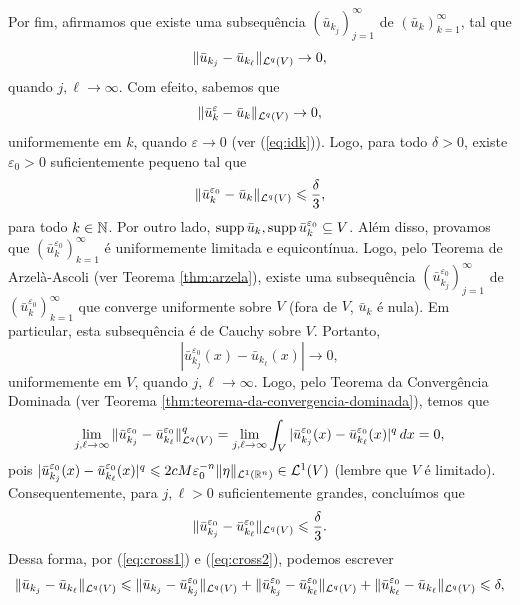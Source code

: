 \begin{prf}
    Por fim, afirmamos que existe uma subsequência $(\bar u_{k_j})_{j=1}^\infty$ de $(\bar u_k)_{k=1}^\infty$, tal que
    \[
        \Vert \bar u_{k_j} - \bar u_{k_\ell} \Vert_{\mathcal{L}^q(V)} \to 0,
    \]
    quando $j,\ell \to \infty$.
    Com efeito, sabemos que
    \[
        \Vert \bar u_k^\varepsilon - \bar u_k \Vert_{\mathcal{L}^q(V)} \to 0,
    \]
    uniformemente em $k$, quando $\varepsilon \to 0$ (ver (\ref{eq:idk})).
    Logo, para todo $\delta > 0$, existe $\varepsilon_0 > 0$ suficientemente pequeno tal que
    \begin{equation} \label{eq:cross1}
        \Vert \bar u_k^{\varepsilon_0} - \bar u_k \Vert_{\mathcal{L}^q(V)} \leqslant \frac{\delta}{3},
    \end{equation}
    para todo $k \in \mathbb{N}$.
    Por outro lado, $\mathrm{supp}\, \bar u_k, \mathrm{supp}\, \bar u_k^{\varepsilon_0} \subseteq V$. Além disso, provamos que $(\bar u_k^{\varepsilon_0})_{k=1}^\infty$ é uniformemente limitada e equicontínua.
    Logo, pelo Teorema de Arzelà-Ascoli (ver Teorema \ref{thm:arzela}), existe uma subsequência $(\bar u_{k_j}^{\varepsilon_0})_{j=1}^\infty$ de $(\bar u_k^{\varepsilon_0})_{k=1}^\infty$ que converge uniformente sobre $V$ (fora de $V$, $\bar u_k$ é nula). Em particular, esta subsequência é de Cauchy sobre $V$.
    Portanto,
    \[
        |\bar u_{k_j}^{\varepsilon_0}(x) - \bar u_{k_\ell}(x)| \to 0,
    \]
    uniformemente em $V$, quando $j,\ell \to \infty$.
    Logo, pelo Teorema da Convergência Dominada (ver Teorema \ref{thm:teorema-da-convergencia-dominada}), temos que
    \[
        \lim_{j,\ell \to \infty} \Vert \bar u_{k_j}^{\varepsilon_0} - \bar u_{k_\ell}^{\varepsilon_0} \Vert_{\mathcal{L}^q(V)}^q = \lim_{j,\ell \to \infty} \int_V | \bar u_{k_j}^{\varepsilon_0}(x) - \bar u_{k_\ell}^{\varepsilon_0}(x)|^q \,dx = 0,
    \]
    pois $| \bar u_{k_j}^{\varepsilon_0}(x) - \bar u_{k_\ell}^{\varepsilon_0}(x)|^q \leqslant 2 cM \varepsilon_0^{-n} \Vert \eta \Vert_{\mathcal{L}^1(\mathbb{R}^n)} \in \mathcal{L}^1(V)$ (lembre que $V$ é limitado).
    Consequentemente, para $j,\ell > 0$ suficientemente grandes, concluímos que
    \begin{equation} \label{eq:cross2}
        \Vert \bar u_{k_j}^{\varepsilon_0} - \bar u_{k_\ell}^{\varepsilon_0} \Vert_{\mathcal{L}^q(V)} \leqslant \frac{\delta}{3}.
    \end{equation}
    Dessa forma, por (\ref{eq:cross1}) e (\ref{eq:cross2}), podemos escrever
    \[
        \Vert \bar u_{k_j} - \bar u_{k_\ell} \Vert_{\mathcal{L}^q(V)} \leqslant \Vert \bar u_{k_j} - \bar u_{k_j}^{\varepsilon_0} \Vert_{\mathcal{L}^q(V)} + \Vert \bar u_{k_j}^{\varepsilon_0} - \bar u_{k_\ell}^{\varepsilon_0} \Vert_{\mathcal{L}^q(V)} + \Vert \bar u_{k_\ell}^{\varepsilon_0} - \bar u_{k_\ell} \Vert_{\mathcal{L}^q(V)} \leqslant \delta,
\]
\end{prf}
